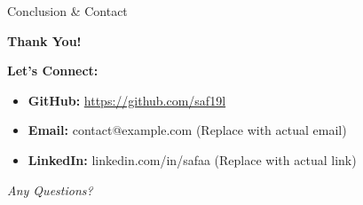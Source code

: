 \documentclass{beamer}
\begin{document}
\begin{frame}{Conclusion \& Contact}
    \begin{center}
        \Large{\textbf{Thank You!}}
        
        \vspace{0.5cm}
        \normalsize
        \textbf{Let's Connect:}
        \vspace{0.2cm}
        
        \begin{itemize}
            \item[] \textbf{GitHub:} \url{https://github.com/saf19l}
            \item[] \textbf{Email:} contact@example.com (Replace with actual email)
            \item[] \textbf{LinkedIn:} linkedin.com/in/safaa (Replace with actual link)
        \end{itemize}
        
        \vspace{0.5cm}
        \textit{Any Questions?}
    \end{center}
\end{frame}
\end{document}
